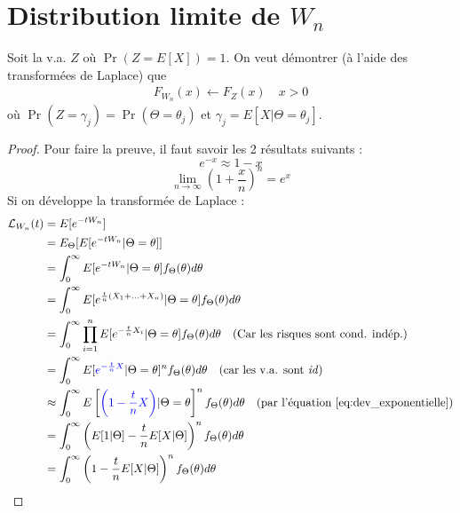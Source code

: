 \section{Distribution limite de $W_n$}
\label{preuve:dist_limiteWn}
\begin{tcolorbox}
Soit la v.a. $Z$ où $\Pr(Z = E[X]) = 1$. On veut démontrer (à l'aide des transformées de Laplace) que
\begin{align*}
F_{W_n}(x) \longleftarrow F_{Z}(x) \quad x > 0
\end{align*}
où $\Pr(Z = \gamma_j) = \Pr(\Theta = \theta_j)$ et $\gamma_j = E[X | \Theta = \theta_j]$.
\end{tcolorbox}

\begin{proof}
Pour faire la preuve, il faut savoir les 2 résultats suivants : 
\begin{equation}
\label{eq:dev_exponentielle}
e^{-x} \approx 1 - x
\end{equation}
\begin{equation}
\label{eq:dev_taylor}
\lim_{n \to \infty} \left( 1 + \frac{x}{n} \right)^n = e^x
\end{equation}
Si on développe la transformée de Laplace : 
\begin{align*}
\laplace_{W_n}(t)	& = E[e^{-t W_n}] \\
	& = E_\Theta [ E[ e^{-t W_n} | \Theta = \theta]] \\
	& = \int_{0}^\infty E[e^{-t W_n} | \Theta = \theta] f_\Theta(\theta) d\theta \\
	& = \int_{0}^{\infty} E[e^{\frac{t}{n} (X_1 + ... + X_n)} | \Theta = \theta] f_\Theta(\theta) d \theta \\
	& = \int_{0}^{\infty} \prod_{i=1}^{n} E[e^{-\frac{t}{n} X_i} | \Theta = \theta] f_\Theta (\theta) d \theta \quad \text{(Car les risques sont cond. indép.)}\\
	& = \int_{0}^{\infty} E[ \blue{e^{- \frac{t}{n} X}} | \Theta = \theta]^n f_\Theta (\theta) d \theta \quad \text{(car les v.a. sont \textit{id})} \\
	& \approx \int_{0}^{\infty} E \left[ \blue{\left(1 - \frac{t}{n} X \right)} | \Theta = \theta \right]^n f_\Theta (\theta) d \theta  \quad \text{(par l'équation \eqref{eq:dev_exponentielle})} \\
	& = \int_{0}^{\infty} \left( E[1 | \Theta] - \frac{t}{n} E[X|\Theta] \right)^n f_\Theta (\theta) d \theta \\
	& = \int_{0}^{\infty} \left( 1 - \frac{t}{n} E[X|\Theta] \right)^n f_\Theta (\theta) d \theta \\

\end{align*}
\end{proof}

